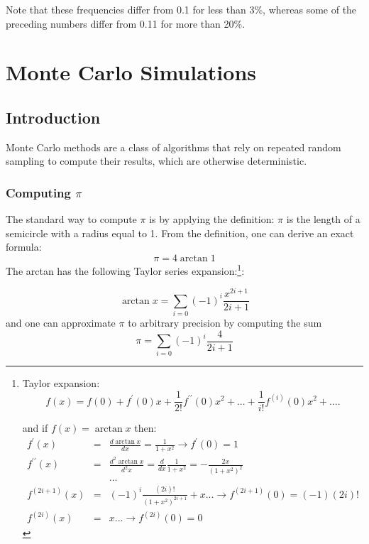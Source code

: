 \documentclass[justified, sixbynine]{tufte-book}
\theoremstyle{plain}%
\newtheorem * {corollary}{Corollary}
\theoremstyle{definition}
\theoremstyle{remark}
\newtheorem * {remark}{Remark}
\newtheorem * {note}{Note}
\begin{document}
\begin{fullwidth}
Note that these frequencies differ from 0.1 for less than 3\%, whereas some of
the preceding numbers differ from 0.11 for more than 20\%.

\chapter{Monte Carlo Simulations}

\goodbreak\section{Introduction}

Monte Carlo methods are a class of algorithms that rely on repeated random sampling to compute their results, which are otherwise deterministic.

\goodbreak\subsection{Computing $\pi$}

The standard way to compute $\pi $ is by applying the definition: $\pi $ is
the length of a semicircle with a radius equal to 1. From the definition, one can
derive an exact formula:
\begin{equation}
\pi =4\arctan 1
\end{equation}
The arctan has the following Taylor series expansion:\footnote{%
Taylor expansion:
\begin{equation}
f(x)=f(0)+f^{\prime }(0)x+\frac 1{2!}f^{\prime \prime }(0)x^2+...+\frac
1{i!}f^{(i)}(0)x^2+....
\end{equation}
\par
and if $f(x)=\arctan x$ then:
\begin{eqnarray}
f^{\prime }(x) &=&\frac{d\arctan x}{dx}=\frac 1{1+x^2}\rightarrow f^{\prime
}(0)=1 \\
f^{\prime \prime }(x) &=&\frac{d^2\arctan x}{d^2x}=\frac d{dx}\frac
1{1+x^2}=-\frac{2x}{(1+x^2)^2} \\
&&... \\
f^{(2i+1)}(x) &=&(-1)^i\frac{(2i)!}{(1+x^2)^{2i+1}}+x...\rightarrow
f^{(2i+1)}(0)=(-1)(2i)! \\
f^{(2i)}(x) &=&x...\rightarrow f^{(2i)}(0)=0
\end{eqnarray}
}:

\begin{equation}
\arctan x=\allowbreak \sum_{i=0}(-1)^i\frac{x^{2i+1}}{2i+1}
\end{equation}
and one can approximate $\pi $ to arbitrary precision by computing the sum
\begin{equation}
\pi =\allowbreak \sum_{i=0}(-1)^i\frac 4{2i+1}
\end{equation}


\end{fullwidth}
\end{document}
